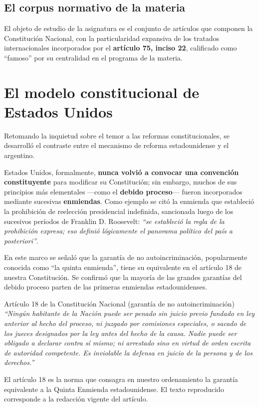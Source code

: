 \documentclass[12pt,oneside]{book}
\begin{document}
\subsection{El corpus normativo de la materia}

El objeto de estudio de la asignatura es el conjunto de artículos que componen la Constitución Nacional, con la particularidad expansiva de los tratados internacionales incorporados por el \textbf{artículo 75, inciso 22}, calificado como ``famoso'' por su centralidad en el programa de la materia.

\section{El modelo constitucional de Estados Unidos}

Retomando la inquietud sobre el temor a las reformas constitucionales, se desarrolló el contraste entre el mecanismo de reforma estadounidense y el argentino.

Estados Unidos, formalmente, \textbf{nunca volvió a convocar una convención constituyente} para modificar su Constitución; sin embargo, muchos de sus principios más elementales ---como el \textbf{debido proceso}--- fueron incorporados mediante sucesivas \textbf{enmiendas}. Como ejemplo se citó la enmienda que estableció la prohibición de reelección presidencial indefinida, sancionada luego de los sucesivos períodos de Franklin D. Roosevelt: \textit{``se estableció la regla de la prohibición expresa; eso definió lógicamente el panorama político del país a posteriori''}.

En este marco se señaló que la garantía de no autoincriminación, popularmente conocida como ``la quinta enmienda'', tiene su equivalente en el artículo 18 de nuestra Constitución. Se confirmó que la mayoría de las grandes garantías del debido proceso parten de las primeras enmiendas estadounidenses.

\begin{norma}{Artículo 18 de la Constitución Nacional (garantía de no autoincriminación)}
\textit{``Ningún habitante de la Nación puede ser penado sin juicio previo fundado en ley anterior al hecho del proceso, ni juzgado por comisiones especiales, o sacado de los jueces designados por la ley antes del hecho de la causa. Nadie puede ser obligado a declarar contra sí mismo; ni arrestado sino en virtud de orden escrita de autoridad competente. Es inviolable la defensa en juicio de la persona y de los derechos.''}

\medskip
El artículo 18 es la norma que consagra en nuestro ordenamiento la garantía equivalente a la Quinta Enmienda estadounidense. El texto reproducido corresponde a la redacción vigente del artículo.
\end{norma}
\end{document}
